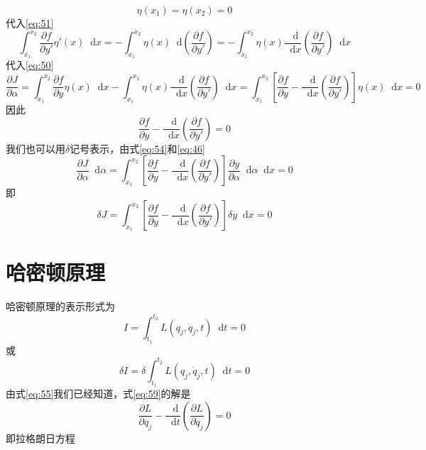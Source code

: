 \documentclass{article}
\newcommand*{\dif}{\mathop{}\!\mathrm{d}}
\begin{document}
 \begin{equation}
   \label{eq:52}
    \eta (x_{1}) = \eta (x_{2}) = 0
  \end{equation}
代入\ref{eq:51}
 \begin{equation}
   \label{eq:53}
   \int_{x_{1}}^{x_{2}} \frac{\partial f}{\partial y'} \eta'(x) \dif x = - \int_{x_{1}}^{x_{2}} \eta (x) \dif \left( \frac{\partial f}{\partial y'} \right) = - \int_{x_{1}}^{x_{2}} \eta (x) \frac{\dif}{\dif x} \left( \frac{\partial f}{\partial y'} \right) \dif x
 \end{equation}
 代入\ref{eq:50}
 \begin{equation}
   \label{eq:54}
   \frac{\partial J}{\partial \alpha} = \int_{x_{1}}^{x_{2}} \frac{\partial f}{\partial y} \eta (x) \dif x - \int_{x_{1}}^{x_{2}} \eta (x) \frac{\dif}{\dif x} \left( \frac{\partial f}{\partial y'} \right) \dif x = \int_{x_{1}}^{x_{2}} \left[ \frac{\partial f}{\partial y} -  \frac{\dif}{\dif x} \left( \frac{\partial f}{\partial y'} \right) \right]\eta (x) \dif x = 0
\end{equation}
 因此
\begin{equation}
   \label{eq:55}
   \frac{\partial f}{\partial y} -  \frac{\dif}{\dif x} \left( \frac{\partial f}{\partial y'} \right) = 0
 \end{equation}
 我们也可以用$\delta$记号表示，由式\ref{eq:54}和\ref{eq:46}
 \begin{equation}
   \label{eq:56}
    \frac{\partial J}{\partial \alpha} \dif \alpha = \int_{x_{1}}^{x_{2}} \left[ \frac{\partial f}{\partial y} -  \frac{\dif}{\dif x} \left( \frac{\partial f}{\partial y'} \right) \right] \frac{\partial y}{\partial \alpha} \dif \alpha \dif x = 0
  \end{equation}
  即
  \begin{equation}
    \label{eq:57}
    \delta J = \int_{x_{1}}^{x_{2}} \left[ \frac{\partial f}{\partial y} -  \frac{\dif}{\dif x} \left( \frac{\partial f}{\partial y'} \right) \right] \delta  y \dif x = 0
  \end{equation}

  \section{哈密顿原理}

  哈密顿原理的表示形式为
  \begin{equation}
    \label{eq:58}
    I = \int_{t_{1}}^{t_{2}} L \left( q_{j},\dot{q}_{j},t \right) \dif t= 0
  \end{equation}
  或
  \begin{equation}
    \label{eq:59}
    \delta I = \delta \int_{t_{1}}^{t_{2}} L \left( q_{j},\dot{q}_{j},t \right) \dif t= 0
  \end{equation}
  由式\ref{eq:55}我们已经知道，式\ref{eq:59}的解是
  \begin{equation}
    \label{eq:60}
    \frac{\partial L}{\partial q_{j}} -  \frac{\dif}{\dif t} \left( \frac{\partial L}{\partial \dot{q}_{j}} \right) = 0
  \end{equation}
  即拉格朗日方程
\end{document}
